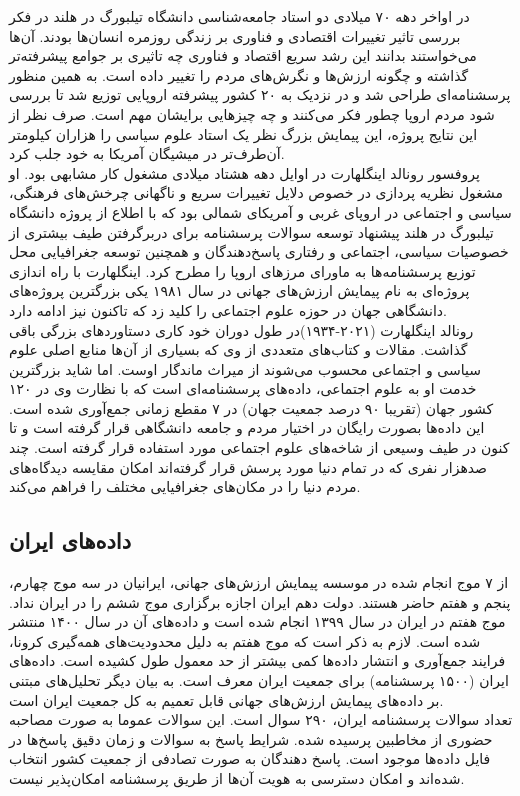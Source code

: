 \documentclass[
]{article}
\begin{document}
در اواخر دهه ۷۰ میلادی دو استاد جامعه‌شناسی دانشگاه تیلبورگ در هلند در
فکر بررسی تاثیر تغییرات اقتصادی و فناوری بر زندگی روزمره انسان‌ها بودند.
آن‌ها می‌خواستند بدانند این رشد سریع اقتصاد و فناوری چه تاثیری بر جوامع
پیشرفته‌تر گذاشته و چگونه ارزش‌ها و نگرش‌های مردم را تغییر داده است. به
همین منظور پرسشنامه‌ای طراحی شد و در نزدیک به ۲۰ کشور پیشرفته اروپایی
توزیع شد تا بررسی شود مردم اروپا چطور فکر می‌کنند و چه چیزهایی برایشان
مهم است. صرف نظر از این نتایج پروژه، این پیمایش بزرگ نظر یک استاد علوم
سیاسی را هزاران کیلومتر آن‌طرف‌تر در میشیگان آمریکا به خود جلب کرد.\\
پروفسور رونالد اینگلهارت در اوایل دهه هشتاد میلادی مشغول کار مشابهی بود.
او مشغول نظریه پردازی در خصوص دلایل تغییرات سریع و ناگهانی چرخش‌های
فرهنگی، سیاسی و اجتماعی در اروپای غربی و آمریکای شمالی بود که با اطلاع
از پروژه دانشگاه تیلبورگ در هلند پیشنهاد توسعه سوالات پرسشنامه برای
دربرگرفتن طیف بیشتری از خصوصیات سیاسی، اجتماعی و رفتاری پاسخ‌دهندگان و
همچنین توسعه جغرافیایی محل توزیع پرسشنامه‌ها به ماورای مرزهای اروپا را
مطرح کرد. اینگلهارت با راه اندازی پروژه‌ای به نام پیمایش ارزش‌های جهانی در
سال ۱۹۸۱ یکی بزرگترین پروژه‌های دانشگاهی جهان در حوزه علوم اجتماعی را
کلید زد که تاکنون نیز ادامه دارد.\\
رونالد اینگلهارت (۲۰۲۱-۱۹۳۴)در طول دوران خود کاری دستاوردهای بزرگی باقی
گذاشت. مقالات و کتاب‌های متعددی از وی که بسیاری از آن‌ها منابع اصلی علوم
سیاسی و اجتماعی محسوب می‌شوند از میراث ماندگار اوست. اما شاید بزرگترین
خدمت او به علوم اجتماعی، داده‌های پرسشنامه‌ای است که با نظارت وی در ۱۲۰
کشور جهان (تقریبا ۹۰ درصد جمعیت جهان) در ۷ مقطع زمانی جمع‌آوری شده است.
این داده‌ها بصورت رایگان در اختیار مردم و جامعه دانشگاهی قرار گرفته است و
تا کنون در طیف وسیعی از شاخه‌های علوم اجتماعی مورد استفاده قرار گرفته
است. چند صدهزار نفری که در تمام دنیا مورد پرسش قرار گرفته‌اند امکان
مقایسه دیدگاه‌های مردم دنیا را در مکان‌های جغرافیایی مختلف را فراهم می‌کند.

\hypertarget{ux62fux627ux62fux647ux647ux627ux6cc-ux627ux6ccux631ux627ux646}{%
\subsection{داده‌های
ایران}\label{ux62fux627ux62fux647ux647ux627ux6cc-ux627ux6ccux631ux627ux646}}

از ۷ موج انجام شده در موسسه پیمایش ارزش‌های جهانی، ایرانیان در سه موج
چهارم، پنجم و هفتم حاضر هستند. دولت دهم ایران اجازه برگزاری موج ششم را
در ایران نداد. موج هفتم در ایران در سال ۱۳۹۹ انجام شده است و داده‌های آن
در سال ۱۴۰۰ منتشر شده است. لازم به ذکر است که موج هفتم به دلیل
محدودیت‌های همه‌گیری کرونا، فرایند جمع‌آوری و انتشار داده‌ها کمی بیشتر از حد
معمول طول کشیده است. داده‌های ایران (۱۵۰۰ پرسشنامه) برای جمعیت ایران معرف
است. به بیان دیگر تحلیل‌های مبتنی بر داده‌های پیمایش ارزش‌های جهانی قابل
تعمیم به کل جمعیت ایران است.\\
تعداد سوالات پرسشنامه ایران، ۲۹۰ سوال است. این سوالات عموما به صورت
مصاحبه حضوری از مخاطبین پرسیده شده. شرایط پاسخ به سوالات و زمان دقیق
پاسخ‌ها در فایل داده‌ها موجود است. پاسخ دهندگان به صورت تصادفی از جمعیت
کشور انتخاب شده‌اند و امکان دسترسی به هویت آن‌ها از طریق پرسشنامه
امکان‌پذیر نیست.
\end{document}
